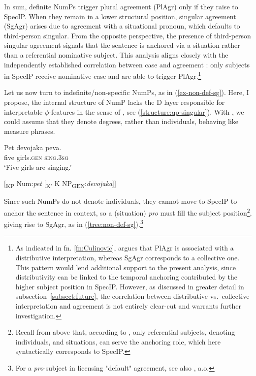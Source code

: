 \documentclass[output=paper,colorlinks,citecolor=brown
]{langscibook}
\begin{document}
In sum, definite NumPs trigger plural agreement (PlAgr) only if they raise to SpecIP. When they remain in a lower structural position, singular agreement (SgAgr) arises due to agreement with a situational pronoun, which defaults to third-person singular. From the opposite perspective, the presence of third-person singular agreement signals that the sentence is anchored via a situation rather than a referential nominative subject. This analysis aligns closely with the independently established correlation between case and agreement \citep{Boskovic2008}: only subjects in SpecIP receive nominative case and are able to trigger PlAgr.\footnote{As indicated in fn. \ref{fn:Culinovic}, \citet{Culinovic2017} argues that PlAgr is associated with a distributive interpretation, whereas SgAgr corresponds to a collective one. This pattern would lend additional support to the present analysis, since distributivity can be linked to the temporal anchoring contributed by the higher subject position in SpecIP. However, as discussed in greater detail in subsection~\ref{subsect:future}, the correlation between distributive vs.\ collective interpretation and agreement is not entirely clear-cut and warrants further investigation.}


Let us now turn to indefinite/non-specific NumPs, as in (\ref{ex-non-def-sg}). Here, I propose, the internal structure of NumP lacks the D layer responsible for interpretable $\phi$-features in the sense of \citet{Pereltsvaig2006}, see (\ref{structure:qp-singular}). With \citet{Matushansky2014, Matushansky2015}, we could assume that they denote degrees, rather than individuals, behaving like measure phrases.


 \ea \label{ex-non-def-sg}
 \gll Pet devojaka peva. \\
five girls.\textsc{gen} \textsc{sing.3sg} \\
\glt `Five girls are singing.'
\z

\ea \label{structure:qp-singular}
$[$\textsubscript{KP} Num:\textit{pet} [\textsubscript{K'} K NP\textsubscript{GEN}:\textit{devojaka}]$]$
\z 

\noindent Since such NumPs do not denote individuals, they cannot move to SpecIP to anchor the sentence in context, so a (situation) \textit{pro} must fill the subject position\footnote{Recall from above that, according to \citet{Hinterholzl2019, Hinterholzl2024subjects}, only referential subjects, denoting individuals, and situations, can serve the anchoring role, which here syntactically corresponds to SpecIP.}, giving rise to SgAgr, as in (\ref{tree:non-def-sg}).\footnote{For a \textit{pro}-subject in licensing "default" agreement, see also \citet{Franks1994, Franks1995, Murphy2018}, a.o.}
\end{document}
